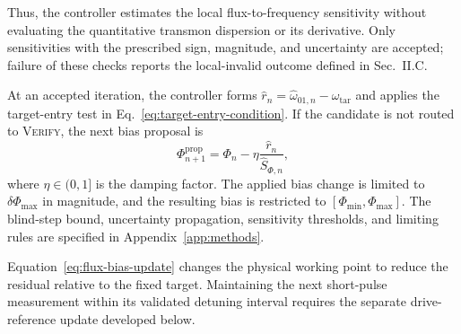 %
Thus, the controller estimates the local flux-to-frequency sensitivity
without evaluating the quantitative transmon dispersion or its derivative.
Only sensitivities with the prescribed sign, magnitude, and uncertainty are
accepted; failure of these checks reports the local-invalid outcome defined
in Sec.~II.C.

At an accepted iteration, the controller forms
$\widehat r_n
=\widehat\omega_{01,n}-\omega_{\mathrm{tar}}$
and applies the target-entry test in
Eq.~\eqref{eq:target-entry-condition}. If the candidate is not routed to
\textsc{Verify}, the next bias proposal is
%
\begin{equation}
\Phi_{n+1}^{\mathrm{prop}}
=
\Phi_n
-
\eta
\frac{\widehat r_n}{\widehat S_{\Phi,n}},
\label{eq:flux-bias-update}
\end{equation}
%
where $\eta\in(0,1]$ is the damping factor. The applied bias change is limited
to $\delta\Phi_{\max}$ in magnitude, and the resulting bias is restricted to
$[\Phi_{\min},\Phi_{\max}]$. The blind-step bound, uncertainty propagation,
sensitivity thresholds, and limiting rules are specified in
Appendix~\ref{app:methods}.

Equation~\eqref{eq:flux-bias-update} changes the physical working point to
reduce the residual relative to the fixed target. Maintaining the next
short-pulse measurement within its validated detuning interval requires the
separate drive-reference update developed below.


